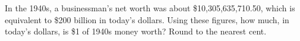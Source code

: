 In the 1940s, a businessman's net worth was about \$10{,}305{,}635{,}710.50, which is equivalent to \$200 billion in today's dollars. Using these figures, how much, in today's dollars, is \$1 of 1940s money worth? Round to the nearest cent.
